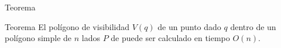 \documentclass[aspectratio=169,xcolor=dvipsnames, t]{beamer}
\begin{document}

\begin{frame}{Teorema}
    \begin{block}{Teorema}
        El polígono de visibilidad $V(q)$ de un punto dado $q$ dentro de un polígono simple de $n$ lados $P$ de puede ser calculado en tiempo $O(n)$.
    \end{block}
\end{frame}

\makefinalpage
\end{document}
